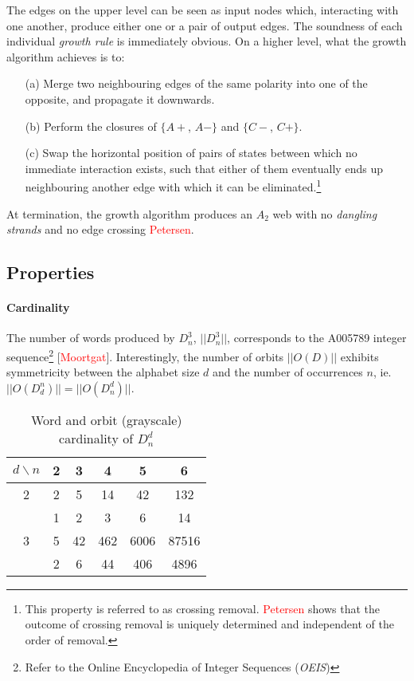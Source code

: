 \documentclass[nonatbib,numbers,10pt]{sigplanconf}
\newcommand\todo[1]{\textcolor{red}{#1}}
\begin{document}
The edges on the upper level can be seen as input nodes which, interacting with one another, produce either one or a pair of output edges. The soundness of each individual \textit{growth rule} is immediately obvious. On a higher level, what the growth algorithm achieves is to:
\begin{enumerate}
\item[(a)] Merge two neighbouring edges of the same polarity into one of the opposite, and propagate it downwards.
\item[(b)] Perform the closures of $\{A+$, $A-\}$ and $\{C-$, $C+\}$.
\item[(c)] Swap the horizontal position of pairs of states between which no immediate interaction exists, such that either of them eventually ends up neighbouring another edge with which it can be eliminated.\footnote{This property is referred to as crossing removal. \todo{Petersen} shows that the outcome of crossing removal is uniquely determined and independent of the order of removal.}
\end{enumerate}

At termination, the growth algorithm produces an $A_2$ web with no \textit{dangling strands} and no edge crossing \todo{Petersen}. 
\subsection{Properties}
\paragraph{Cardinality}
The number of words produced by $D^3_n$, $| \! | D^3_n | \! |$, corresponds to the A005789 integer sequence\footnote{Refer to the Online Encyclopedia of Integer Sequences (\textit{OEIS})} [\todo{Moortgat}].
Interestingly, the number of orbits $| \! | O(D) | \! |$ exhibits symmetricity between the alphabet size $d$ and the number of occurrences $n$, ie. $| \! | O(D^n_d) | \! | = | \! | O(D^d_n) | \! |$.
\begin{table}[h!]
\begin{center}
\begin{tabular}{c | c c c c c }
$d \backslash n$ & 2 & 3 & 4 & 5 & 6\\
\hline
2 & 2 & 5 & 14 & 42 & 132\\
\rowcolor{Gray}
\ & 1 & 2 & 3 & 6 & 14\\
3 & 5 & 42 & 462 & 6006 & 87516\\
\rowcolor{Gray}
\ & 2 & 6 & 44 & 406 & 4896\\
\end{tabular}
\end{center}
\caption{Word and orbit (grayscale) cardinality of $D^d_n$}
\end{table}
\end{document}
